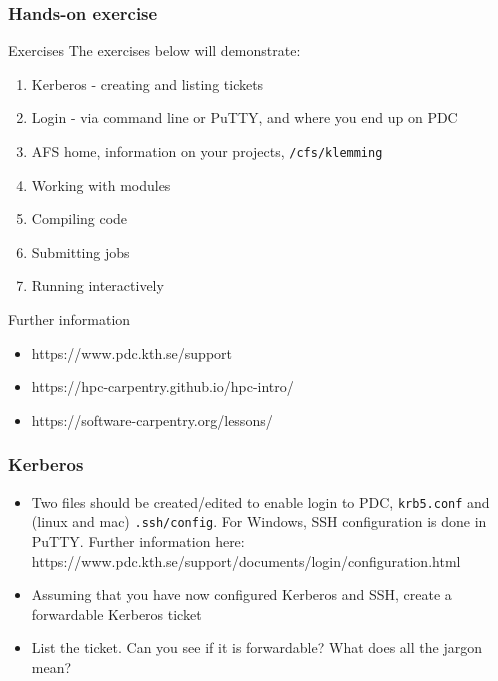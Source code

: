 \begin{frame}[fragile]
  \frametitle{Hands-on exercise}

\footnotesize

\begin{exampleblock}{\large{Exercises}}
The exercises below will demonstrate:
\begin{enumerate}
  \item Kerberos - creating and listing tickets
  \item Login - via command line or PuTTY, and where you end up on PDC
  \item AFS home, information on your projects, \verb|/cfs/klemming|
  \item Working with modules
  \item Compiling code
  \item Submitting jobs
  \item Running interactively
\end{enumerate}
\end{exampleblock}

\begin{exampleblock}{\large{Further information}}
\begin{itemize}
  \item https://www.pdc.kth.se/support
  \item https://hpc-carpentry.github.io/hpc-intro/
  \item https://software-carpentry.org/lessons/
\end{itemize}
\end{exampleblock}

\end{frame}




\begin{frame}[fragile]
  \frametitle{Kerberos}
\begin{itemize}
  \item Two files should be created/edited to enable login to PDC, \verb|krb5.conf| and (linux and mac) \verb|.ssh/config|.
    For Windows, SSH configuration is done in PuTTY. 
    Further information here: https://www.pdc.kth.se/support/documents/login/configuration.html

  \item Assuming that you have now configured Kerberos and SSH, create a forwardable Kerberos ticket
  \item List the ticket. Can you see if it is forwardable? What does all the jargon mean?

\end{itemize}
\end{frame}

